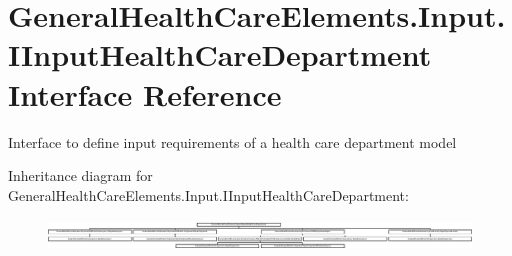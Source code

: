 \hypertarget{interface_general_health_care_elements_1_1_input_1_1_i_input_health_care_department}{}\section{General\+Health\+Care\+Elements.\+Input.\+I\+Input\+Health\+Care\+Department Interface Reference}
\label{interface_general_health_care_elements_1_1_input_1_1_i_input_health_care_department}


Interface to define input requirements of a health care department model  


Inheritance diagram for General\+Health\+Care\+Elements.\+Input.\+I\+Input\+Health\+Care\+Department\+:\begin{figure}[H]
\begin{center}
\leavevmode
\includegraphics[height=0.832714cm]{interface_general_health_care_elements_1_1_input_1_1_i_input_health_care_department}
\end{center}
\end{figure}
